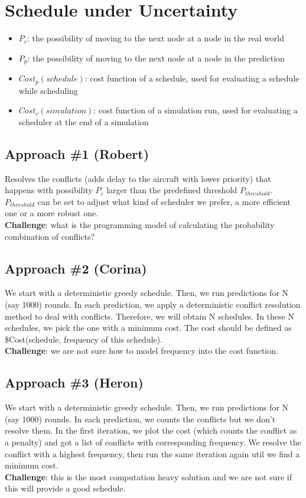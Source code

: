 \documentclass[]{article} \usepackage[margin=1.3in]{geometry} \setlength{\columnsep}{0.2in} \pagenumbering{gobble}
\date{}
\providecommand{\tightlist}{%
  \setlength{\itemsep}{0pt}\setlength{\parskip}{0pt}}
\begin{document}
\section{Schedule under Uncertainty}\label{schedule-under-uncertainty}

\begin{itemize}
\tightlist
\item
  \(P_r\): the possibility of moving to the next node at a node in the
  real world
\item
  \(P_p\): the possibility of moving to the next node at a node in the
  prediction
\item
  \(Cost_p(schedule)\): cost function of a schedule, used for evaluating
  a schedule while scheduling
\item
  \(Cost_r(simulation)\): cost function of a simulation run, used for
  evaluating a scheduler at the end of a simulation
\end{itemize}

\subsection{Approach \#1 (Robert)}\label{approach-1-robert}

Resolves the conflicts (adds delay to the aircraft with lower priority)
that happens with possibility \(P_c\) larger than the predefined
threshold \(P_{threshold}\). \(P_{threshold}\) can be set to adjust what
kind of scheduler we prefer, a more efficient one or a more robust one.\\
\textbf{Challenge}: what is the programming model of calculating the
probability combination of conflicts?

\subsection{Approach \#2 (Corina)}\label{approach-2-corina}

We start with a deterministic greedy schedule. Then, we run predictions
for N (say 1000) rounds. In each prediction, we apply a deterministic
conflict resolution method to deal with conflicts. Therefore, we will
obtain N schedules. In these N schedules, we pick the one with a minimum
cost. The cost should be defined as \$Cost(schedule, frequency of this
schedule).\\\textbf{Challenge}: we are not sure how to model frequency
into the cost function.

\subsection{Approach \#3 (Heron)}\label{approach-3-heron}

We start with a deterministic greedy schedule. Then, we run predictions
for N (say 1000) rounds. In each prediction, we counts the conflicts but
we don't resolve them. In the first iteration, we plot the cost (which
counts the conflict as a penalty) and got a list of conflicts with
corresponding frequency. We resolve the conflict with a highest
frequency, then run the same iteration again util we find a minimum
cost.\\\textbf{Challenge}: this is the most computation heavy solution
and we are not sure if this will provide a good schedule.
\end{document}
